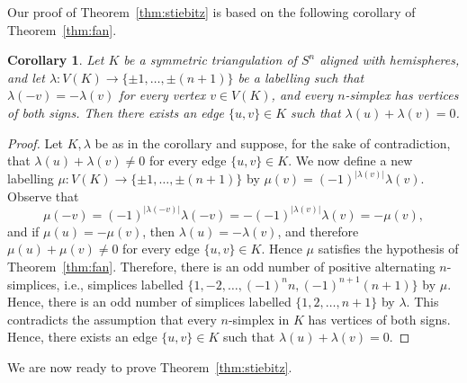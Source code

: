 \documentclass[11pt,a4paper]{amsart}
\newtheorem{corollary}[theorem]{Corollary}
\begin{document}
Our proof of Theorem~\ref{thm:stiebitz} is based on the following
corollary of Theorem~\ref{thm:fan}.

\begin{corollary}
\label{cor:fan}
  Let $K$ be a symmetric triangulation of $S^n$ aligned
  with hemispheres, and let $\lambda:V(K)\to \{\pm1, \ldots, \pm (n+1)\}$
  be a labelling such that $\lambda(-v)=-\lambda(v)$ for every vertex
  $v \in V(K)$, and every $n$-simplex has vertices of both signs. Then
  there exists an edge $\{u,v\} \in K$ such that $\lambda(u)+\lambda(v) = 0$.
\end{corollary}

\begin{proof}
  Let $K, \lambda$ be as in the corollary and suppose, for the sake of contradiction, that
  $\lambda(u)+\lambda(v) \neq 0$ for every edge $\{u,v\} \in K$. We now define a new labelling
  $\mu:V(K) \to \{\pm 1, \ldots, \pm (n+1)\}$ by $\mu(v)=(-1)^{|\lambda(v)|}\lambda(v)$.
  Observe that
  \[
    \mu(-v)=(-1)^{|\lambda(-v)|}\lambda(-v)=-(-1)^{|\lambda(v)|}\lambda(v)=-\mu(v),
  \]
  and if $\mu(u)=-\mu(v)$, then $\lambda(u)=-\lambda(v)$, and therefore
  $\mu(u)+\mu(v) \neq 0$ for every edge $\{u,v\} \in K$.
  Hence $\mu$ satisfies the hypothesis of Theorem~\ref{thm:fan}.
  Therefore, there is an odd number of positive alternating $n$-simplices,
  i.e., simplices labelled $\{1,-2,\ldots,(-1)^n n,(-1)^{n+1}(n+1)\}$ by $\mu$.
  Hence, there is an odd number of simplices labelled $\{1,2,\ldots,n+1\}$
  by $\lambda$.
  This contradicts the assumption that every $n$-simplex in $K$ has vertices of both
  signs. Hence, there exists an edge $\{u,v\} \in K$ such that $\lambda(u)+\lambda(v)=0$.
\end{proof}

We are now ready to prove Theorem~\ref{thm:stiebitz}.
\end{document}
